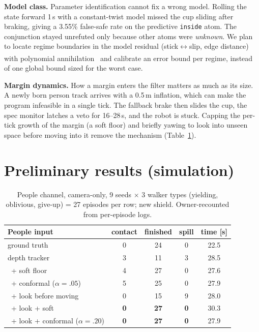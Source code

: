 \documentclass[10pt,twocolumn,letterpaper]{article}
\newcommand{\tv}{\textsuperscript{\dag}}  %
\begin{document}
\textbf{Model class.} Parameter identification cannot fix a wrong model. Rolling the state forward 1\,s with a constant-twist model
missed the cup sliding after braking, giving a 3.55\% false-safe rate on the predictive \texttt{inside} atom. The conjunction stayed
unrefuted only because other atoms were \emph{unknown}. We plan to locate regime boundaries in the model residual (stick$\leftrightarrow$slip,
edge distance) with polynomial annihilation~\cite{pa}\tv{} and calibrate an error bound per regime, instead of one global bound sized for the worst case.

\textbf{Margin dynamics.} How a margin enters the filter matters as much as its size. A newly born person track arrives with a 0.5\,m
inflation, which can make the program infeasible in a single tick. The fallback brake then slides the cup, the spec monitor latches a veto
for 16--28\,s, and the robot is stuck. Capping the per-tick growth of the margin (a soft floor) and briefly yawing to look into unseen space
before moving into it remove the mechanism (Table~\ref{tab:people}).

\section{Preliminary results (simulation)}\label{sec:results}
\begin{table}[t]
\centering\small
\caption{People channel, camera-only, 9 seeds $\times$ 3 walker types (yielding, oblivious, give-up) = 27 episodes per row; new shield.
Owner-recounted from per-episode logs.}
\label{tab:people}
\begin{tabular}{@{}lcccc@{}}
\toprule
People input & contact & finished & spill & time [s]\\
\midrule
ground truth & 0 & 24 & 0 & 22.5\\
depth tracker & 3 & 11 & 3 & 28.5\\
\ + soft floor & 4 & 27 & 0 & 27.6\\
\ + conformal ($\alpha{=}.05$) & 5 & 25 & 0 & 27.9\\
\ + look before moving & 0 & 15 & 9 & 28.0\\
\ + look + soft & \textbf{0} & \textbf{27} & \textbf{0} & 30.3\\
\ + look + conformal ($\alpha{=}.20$) & \textbf{0} & \textbf{27} & \textbf{0} & 27.9\\
\bottomrule
\end{tabular}
\vspace{-1mm}
\end{table}
\end{document}
